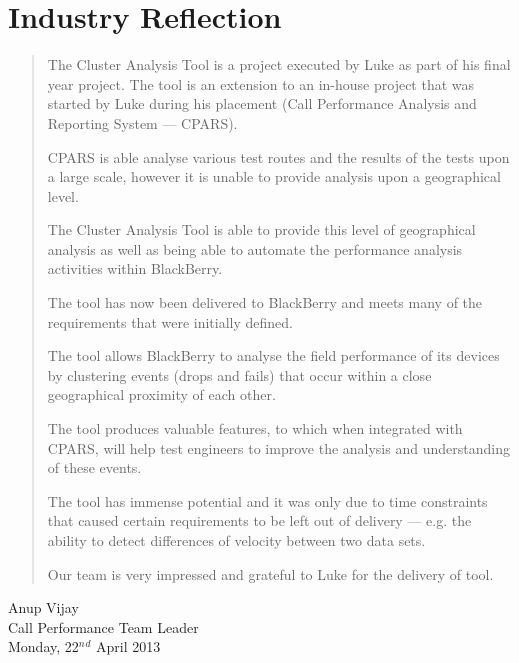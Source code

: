 \section{Industry Reflection}
\label{sec:industry_reflection}

\begin{quote}
The Cluster Analysis Tool is a project executed by Luke as part of his final 
year project. The tool is an extension to an in-house project that was started
by Luke during his placement (Call Performance Analysis and Reporting System 
--- CPARS).

CPARS is able analyse various test routes and the results of the tests upon a 
large scale, however it is unable to provide analysis upon a geographical 
level.

The Cluster Analysis Tool is able to provide this level of geographical 
analysis as well as being able to automate the performance analysis activities 
within BlackBerry.

The tool has now been delivered to BlackBerry and meets many of the 
requirements that were initially defined. 
 
The tool allows BlackBerry to analyse the field performance of its devices by 
clustering events (drops and fails) that occur within a close geographical 
proximity of each other.

The tool produces valuable features, to which when integrated with CPARS, will
help test engineers to improve the analysis and understanding of these events. 

The tool has immense potential and it was only due to time constraints that 
caused certain requirements to be left out of delivery --- e.g. the ability to
detect differences of velocity between two data sets.
 
Our team is very impressed and grateful to Luke for the delivery of tool.
\end{quote}

\begin{flushright}
Anup Vijay \\
Call Performance Team Leader \\
Monday, 22$^n$$^d$ April 2013
\end{flushright}